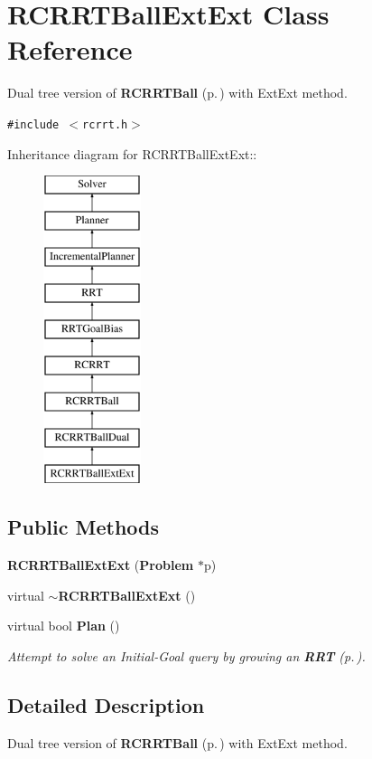 \section{RCRRTBall\-Ext\-Ext  Class Reference}
\label{classRCRRTBallExtExt}
Dual tree version of {\bf RCRRTBall} {\rm (p.\,\pageref{classRCRRTBall})} with Ext\-Ext method. 


{\tt \#include $<$rcrrt.h$>$}

Inheritance diagram for RCRRTBall\-Ext\-Ext::\begin{figure}[H]
\begin{center}
\leavevmode
\includegraphics[height=9cm]{classRCRRTBallExtExt}
\end{center}
\end{figure}
\subsection*{Public Methods}
\begin{CompactItemize}
\item 
{\bf RCRRTBall\-Ext\-Ext} ({\bf Problem} $\ast$p)
\item 
virtual {\bf $\sim$RCRRTBall\-Ext\-Ext} ()
\item 
virtual bool {\bf Plan} ()
\begin{CompactList}\small\item\em Attempt to solve an Initial-Goal query by growing an {\bf RRT} {\rm (p.\,\pageref{classRRT})}.\item\end{CompactList}\end{CompactItemize}


\subsection{Detailed Description}
Dual tree version of {\bf RCRRTBall} {\rm (p.\,\pageref{classRCRRTBall})} with Ext\-Ext method.



